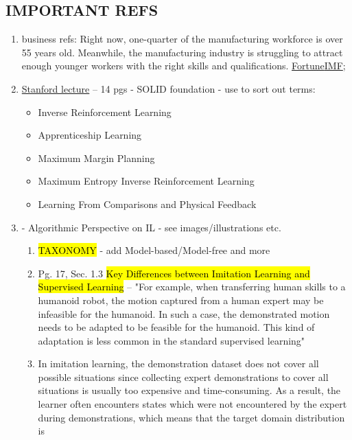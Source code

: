 \documentclass{article}
\newcommand{\hlc}[2][blue!10]{{\colorlet{foo}{#1} \sethlcolor{foo}\hl{#2}}}
\begin{document}
\subsection{IMPORTANT REFS}
\begin{enumerate}
	\item business refs:
	Right now, one-quarter of the manufacturing workforce is over 55 years old. Meanwhile, the manufacturing industry is struggling to attract enough younger workers with the right skills and qualifications.  \href{https://fortune.com/europe/2024/05/29/germany-aging-population-economy-europe-growth-productivity-workforce-imf/}{Fortune}\href{https://www.imf.org/en/News/Articles/2024/03/27/germanys-real-challenges-are-aging-underinvestment-and-too-much-red-tape}{IMF}; 
	\item \href{https://web.stanford.edu/class/cs237b/pdfs/lecture/cs237b_lecture_12.pdf}{Stanford lecture} -- 14 pgs - SOLID foundation - use to sort out terms:
	\begin{itemize}
		\item Inverse Reinforcement Learning  
		\item Apprenticeship Learning 
		\item Maximum Margin Planning
		\item Maximum Entropy Inverse Reinforcement Learning
		\item Learning From Comparisons and Physical Feedback
	\end{itemize}
	\item \cite{Osa-2018} - Algorithmic Perspective on IL - see images/illustrations etc.
	\begin{enumerate}
		\item \hlc{TAXONOMY} - add Model-based/Model-free and more
		\item Pg. 17, Sec. 1.3 
		\hlc{Key Differences between Imitation Learning and Supervised Learning} -- "For example, when transferring human skills to a humanoid robot, the motion captured from a human expert may be infeasible for the humanoid. In such a case, the demonstrated motion needs to be adapted to be feasible for the humanoid. This kind
		of adaptation is less common in the standard supervised learning"
		\item In imitation
		learning, the demonstration dataset does not cover all possible
		situations since collecting expert demonstrations to cover all situations
		is usually too expensive and time-consuming. As a result, the learner
		often encounters states which were not encountered by the expert during
		demonstrations, which means that the target domain distribution is

\end{enumerate}
\end{enumerate}
\end{document}
